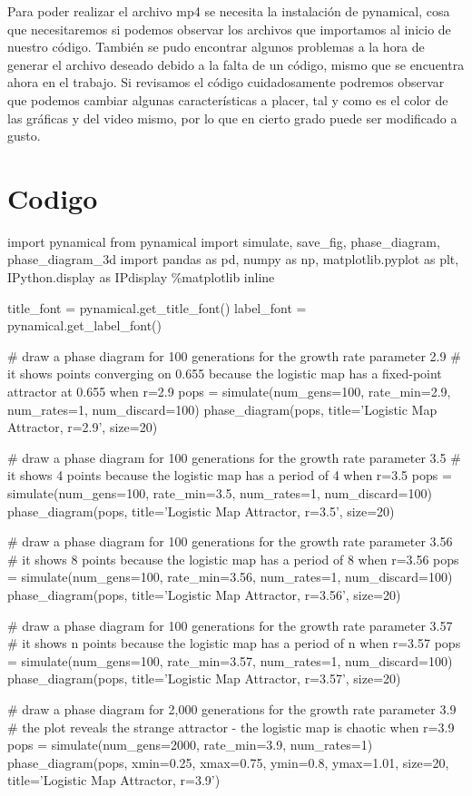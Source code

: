 \documentclass[a4paper,12pt]{article}
\begin{document}
Para poder realizar el archivo mp4 se necesita la instalación de pynamical, cosa que necesitaremos si podemos observar los archivos que importamos al inicio de nuestro código. También se pudo encontrar algunos problemas a la hora de generar el archivo deseado debido a la falta de un código, mismo que se encuentra ahora en el trabajo. Si revisamos el código cuidadosamente podremos observar que podemos cambiar algunas características a placer, tal y como es el color de las gráficas y del video mismo, por lo que en cierto grado puede ser modificado a gusto.

\section*{Codigo}
import pynamical
from pynamical import simulate, save\_fig, phase\_diagram, phase\_diagram\_3d
import pandas as pd, numpy as np, matplotlib.pyplot as plt, IPython.display as IPdisplay
\%matplotlib inline

title\_font = pynamical.get\_title\_font()
label\_font = pynamical.get\_label\_font()

\# draw a phase diagram for 100 generations for the growth rate parameter 2.9
\# it shows points converging on 0.655 because the logistic map has a fixed-point attractor at 0.655 when r=2.9
pops = simulate(num\_gens=100, rate\_min=2.9, num\_rates=1, num\_discard=100)
phase\_diagram(pops, title='Logistic Map Attractor, r=2.9', size=20)

\# draw a phase diagram for 100 generations for the growth rate parameter 3.5
\# it shows 4 points because the logistic map has a period of 4 when r=3.5
pops = simulate(num\_gens=100, rate\_min=3.5, num\_rates=1, num\_discard=100)
phase\_diagram(pops, title='Logistic Map Attractor, r=3.5', size=20)

\# draw a phase diagram for 100 generations for the growth rate parameter 3.56
\# it shows 8 points because the logistic map has a period of 8 when r=3.56
pops = simulate(num\_gens=100, rate\_min=3.56, num\_rates=1, num\_discard=100)
phase\_diagram(pops, title='Logistic Map Attractor, r=3.56', size=20)

\# draw a phase diagram for 100 generations for the growth rate parameter 3.57
\# it shows n points because the logistic map has a period of n when r=3.57
pops = simulate(num\_gens=100, rate\_min=3.57, num\_rates=1, num\_discard=100)
phase\_diagram(pops, title='Logistic Map Attractor, r=3.57', size=20)

\# draw a phase diagram for 2,000 generations for the growth rate parameter 3.9
\# the plot reveals the strange attractor - the logistic map is chaotic when r=3.9
pops = simulate(num\_gens=2000, rate\_min=3.9, num\_rates=1)
phase\_diagram(pops, xmin=0.25, xmax=0.75, ymin=0.8, ymax=1.01, size=20, title='Logistic Map Attractor, r=3.9')
\end{document}
